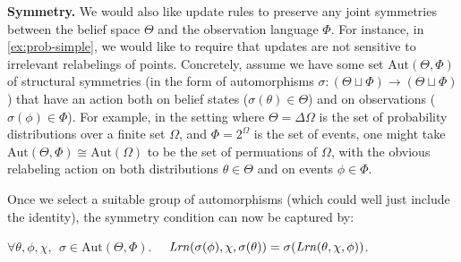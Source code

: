 \textbf{Symmetry.}
We would also like update rules to preserve any joint symmetries between the belief space $\Theta$ and the observation language $\Phi$.
For instance, in \cref{ex:prob-simple}, we would like to require that updates are not sensitive to irrelevant relabelings of points.
Concretely, assume we have some set $\mathrm{Aut}(\Theta, \Phi)$ of 
	structural symmetries
	(in the form of automorphisms $\sigma : (\Theta \sqcup \Phi) \to (\Theta \sqcup \Phi)$)
	that have an action both on belief states ($\sigma(\theta) \in \Theta$) and 
		on observations ($\sigma(\phi) \in \Phi$).
For example, in the setting where $\Theta = \Delta \Omega$ is the set of probability distributions over a finite set $\Omega$, and $\Phi = 2^\Omega$ is the set of events, one might take $\mathrm{Aut}(\Theta,\Phi) \cong \mathrm{Aut}(\Omega)$ to be the set of permuations of $\Omega$, with the obvious relabeling action on both distributions $\theta \in \Theta$ and on events $\phi \in \Phi$.
    
Once we select a suitable group of automorphisms (which could well just include the identity), the symmetry condition can now be captured by:
\begin{LrnAxioms}
	\item
	$\forall \theta,\phi,\chi,~~
	 \sigma
	\in \mathrm{Aut}(\Theta, \Phi)
	.\quad$
$\mathit{Lrn}(\sigma(\phi), \chi , \sigma(\theta)) = \sigma (\mathit{Lrn}(\theta,\chi, \phi))$.
	 \label{ax:symmetry}
\end{LrnAxioms}

